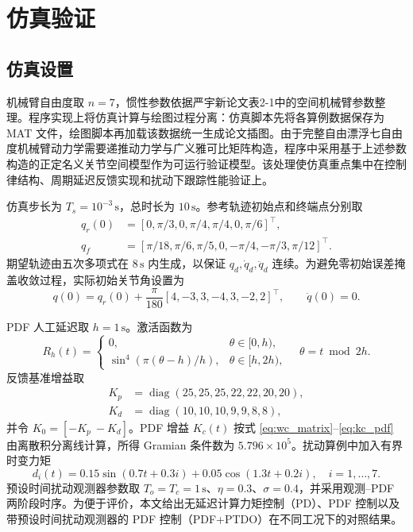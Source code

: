 \section{仿真验证}

\subsection{仿真设置}

机械臂自由度取 \(n=7\)，惯性参数依据严宇新论文表2-1中的空间机械臂参数整理\cite{yan}。程序实现上将仿真计算与绘图过程分离：仿真脚本先将各算例数据保存为 MAT 文件，绘图脚本再加载该数据统一生成论文插图。由于完整自由漂浮七自由度机械臂动力学需要递推动力学与广义雅可比矩阵构造，程序中采用基于上述参数构造的正定名义关节空间模型作为可运行验证模型。该处理使仿真重点集中在控制律结构、周期延迟反馈实现和扰动下跟踪性能验证上。

仿真步长为 \(T_s=10^{-3}\,\mathrm{s}\)，总时长为 \(10\,\mathrm{s}\)。参考轨迹初始点和终端点分别取
\[
\begin{aligned}
q_r(0)&=[0,\pi/3,0,\pi/4,\pi/4,0,\pi/6]^\top,\\
q_f&=[\pi/18,\pi/6,\pi/5,0,-\pi/4,-\pi/3,\pi/12]^\top .
\end{aligned}
\]
期望轨迹由五次多项式在 \(8\,\mathrm{s}\) 内生成，以保证 \(q_d,\dot q_d,\ddot q_d\) 连续。为避免零初始误差掩盖收敛过程，实际初始关节角设置为
\[
q(0)=q_r(0)+\frac{\pi}{180}[4,-3,3,-4,3,-2,2]^\top,
\qquad
\dot q(0)=0 .
\]

PDF 人工延迟取 \(h=1\,\mathrm{s}\)。激活函数为
\[
R_h(t)=
\begin{cases}
0, & \theta\in[0,h),\\
\sin^4\left(\pi(\theta-h)/h\right), & \theta\in[h,2h),
\end{cases}
\quad \theta=t\bmod 2h .
\]
反馈基准增益取
\[
\begin{aligned}
K_p&=\operatorname{diag}(25,25,25,22,22,20,20),\\
K_d&=\operatorname{diag}(10,10,10,9,9,8,8),
\end{aligned}
\]
并令 \(K_0=[-K_p\ -K_d]\)。PDF 增益 \(K_c(t)\) 按式 \eqref{eq:wc_matrix}--\eqref{eq:kc_pdf} 由离散积分离线计算，所得 Gramian 条件数为 \(5.796\times10^5\)。扰动算例中加入有界时变力矩
\[
d_i(t)=0.15\sin(0.7t+0.3i)+0.05\cos(1.3t+0.2i),
\quad i=1,\ldots,7 .
\]
预设时间扰动观测器参数取 \(T_o=T_c=1\,\mathrm{s}\)、\(\eta=0.3\)、\(\sigma=0.4\)，并采用观测--PDF 两阶段时序。为便于评价，本文给出无延迟计算力矩控制（PD）、PDF 控制以及带预设时间扰动观测器的 PDF 控制（PDF+PTDO）在不同工况下的对照结果。

